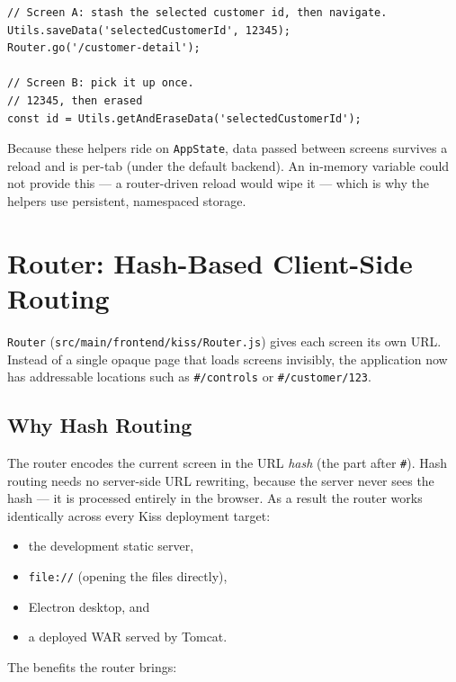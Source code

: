 \begin{lstlisting}[style=javascript]
// Screen A: stash the selected customer id, then navigate.
Utils.saveData('selectedCustomerId', 12345);
Router.go('/customer-detail');

// Screen B: pick it up once.
// 12345, then erased
const id = Utils.getAndEraseData('selectedCustomerId');
\end{lstlisting}

\begin{notebox}
Because these helpers ride on \texttt{AppState}, data passed between screens survives a reload and is per-tab (under the default backend).  An in-memory variable could not provide this --- a router-driven reload would wipe it --- which is why the helpers use persistent, namespaced storage.
\end{notebox}

\section{Router: Hash-Based Client-Side Routing}
\label{sec:rs-router}

\texttt{Router} (\texttt{src/main/frontend/kiss/Router.js}) gives each screen its own URL.  Instead of a single opaque page that loads screens invisibly, the application now has addressable locations such as \texttt{\#/controls} or \texttt{\#/customer/123}.

\subsection{Why Hash Routing}
\label{sec:rs-router-why}

The router encodes the current screen in the URL \emph{hash} (the part after \texttt{\#}).  Hash routing needs no server-side URL rewriting, because the server never sees the hash --- it is processed entirely in the browser.  As a result the router works identically across every Kiss deployment target:

\begin{itemize}
  \item the development static server,
  \item \texttt{file://} (opening the files directly),
  \item Electron desktop, and
  \item a deployed WAR served by Tomcat.
\end{itemize}

\noindent
The benefits the router brings:

